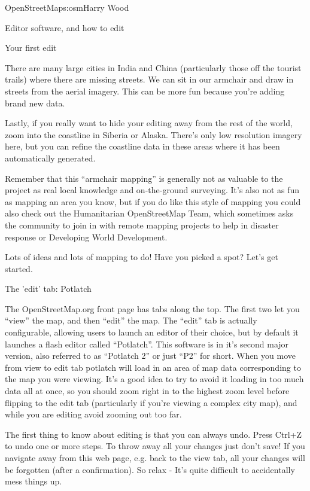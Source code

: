 \begin{aosachapter}{OpenStreetMap}{s:osm}{Harry Wood}
\begin{aosasect1}{Editor software, and how to edit}
\begin{aosasect2}{Your first edit}
\begin{aosaitemize}
\item There are many large cities in India and China (particularly
  those off the tourist trails) where there are missing streets. We
  can sit in our armchair and draw in streets from the aerial
  imagery. This can be more fun because you're adding brand new data.

\item Lastly, if you really want to hide your editing away from the
  rest of the world, zoom into the coastline in Siberia or
  Alaska. There's only low resolution imagery here, but you can refine
  the coastline data in these areas where it has been automatically
  generated.

\end{aosaitemize}

Remember that this ``armchair mapping'' is generally not as valuable
to the project as real local knowledge and on-the-ground
surveying. It's also not as fun as mapping an area you know, but if
you do like this style of mapping you could also check out the
Humanitarian OpenStreetMap Team, which sometimes asks the community to
join in with remote mapping projects to help in disaster response or
Developing World Development.

Lots of ideas and lots of mapping to do! Have you picked a spot? Let's
get started.

\end{aosasect2}

\begin{aosasect2}{The 'edit' tab: Potlatch}

The OpenStreetMap.org front page has tabs along the top. The first two
let you ``view'' the map, and then ``edit'' the map. The ``edit'' tab
is actually configurable, allowing users to launch an editor of their
choice, but by default it launches a flash editor called
``Potlatch''. This software is in it's second major version, also
referred to as ``Potlatch 2'' or just ``P2'' for short. When you move
from view to edit tab potlatch will load in an area of map data
corresponding to the map you were viewing. It's a good idea to try to
avoid it loading in too much data all at once, so you should zoom
right in to the highest zoom level before flipping to the edit tab
(particularly if you're viewing a complex city map), and while you are
editing avoid zooming out too far.

The first thing to know about editing is that you can always
undo. Press Ctrl+Z to undo one or more steps. To throw away all your
changes just don't save! If you navigate away from this web page,
e.g. back to the view tab, all your changes will be forgotten (after a
confirmation). So relax - It's quite difficult to accidentally mess
things up.


\end{aosasect2}
\end{aosasect1}
\end{aosachapter}
